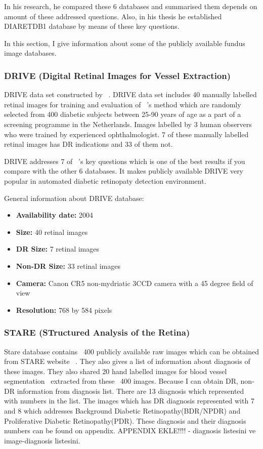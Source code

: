 In his research, he compared these 6 databases and summarised them depends on amount of these addressed questions\cite{kauppi2013constructing}. Also, in his thesis he established DIARETDB1 database by means of these key questions.

In this section, I give information about some of the publicly available fundus image databases.

\subsubsection{DRIVE (Digital Retinal Images for Vessel Extraction)}
DRIVE data set constructed by ~\cite{staal2004ridge}.
DRIVE data set includes 40 manually labelled retinal images for training and evaluation of ~\cite{staal2004ridge}'s method which are randomly selected from 400 diabetic subjects between 25-90 years of age as a part of a screening programme in the Netherlands. Images labelled by 3 human observers who were trained by experienced ophthalmologist. 7 of these manually labelled retinal images has DR indications and 33 of them not. 

DRIVE addresses 7 of ~\cite{kauppi2013constructing}'s key questions which is one of the best results if you compare with the other 6 databases. It makes publicly available DRIVE very popular in automated diabetic retinopaty detection environment.

General information about DRIVE database:
\begin{itemize}
    \item \textbf{Availability date: } 2004
    \item \textbf{Size: } 40 retinal images
    \item \textbf{DR Size: } 7 retinal images
    \item \textbf{Non-DR Size: } 33 retinal images
    \item \textbf{Camera: } Canon CR5 non-mydriatic 3CCD camera with a 45 degree field of view
    \item \textbf{Resolution: } 768 by 584 pixels
\end{itemize}

\subsubsection{STARE (STructured Analysis of the Retina)}
Stare database contains ~400 publicly available raw images which can be obtained from STARE website ~\cite{STARE}. They also gives a list of information about diagnosis of these images. They also shared 20 hand labelled images for blood vessel segmentation~\cite{hoover2000locating} extracted from these ~400 images. Because I can obtain DR, non-DR information from diagnosis list. There are 13 diagnosis which represented with numbers in the list. The images which has DR diagnosis represented with 7 and 8 which addresses Background Diabetic Retinopathy(BDR/NPDR) and Proliferative Diabetic Retinopathy(PDR). These diagnosis and their diagnosis numbers can be found on appendix. {APPENDIX EKLE!!!!} - diagnosis listesini ve image-diagnosis listesini.

